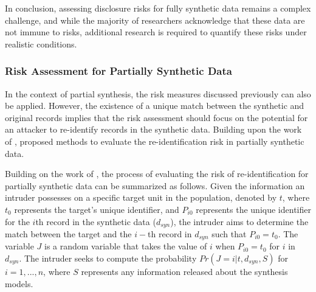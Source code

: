 In conclusion, assessing disclosure risks for fully synthetic data remains a complex challenge, and while the majority of researchers acknowledge that these data are not immune to risks, additional research is required to quantify these risks under realistic conditions.



\subsubsection{Risk Assessment for Partially Synthetic Data}
\label{subsubsec:riskpartialsyn}
In the context of partial synthesis, the risk measures discussed previously can also be applied. However, the existence of a unique match between the synthetic and original records implies that the risk assessment should focus on the potential for an attacker to re-identify records in the synthetic data. Building upon the work of \citet{reiter2005estimating}, \citet{reiter2009estimating} proposed methods to evaluate the re-identification risk in partially synthetic data.

Building on the work of \citet{drechsler2010sampling}, the process of evaluating the risk of re-identification for partially synthetic data can be summarized as follows. Given the information an intruder possesses on a specific target unit in the population, denoted by $t$, where $t_0$ represents the target's unique identifier, and $P_{i0}$ represents the unique identifier for the $i$th record in the synthetic data ($d_{syn}$), the intruder aims to determine the match between the target and the $i-$th record in $d_{syn}$ such that $P_{i0}= t_0$. The variable $J$ is a random variable that takes the value of $i$ when $P_{i0} = t_0$ for $i$ in $d_{syn}$. The intruder seeks to compute the probability $Pr(J = i|t, d_{syn}, S)$ for $i = 1, . . . , n$, where $S$ represents any information released about the synthesis models.

